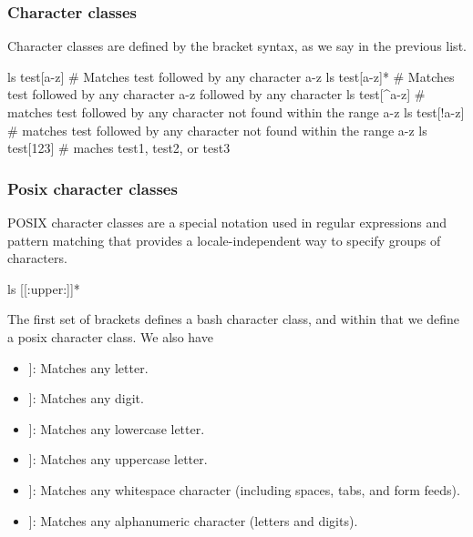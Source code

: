 \documentclass{report}
\begin{document}
    \subsubsection{Character classes}
    \bigbreak \noindent 
    Character classes are defined by the bracket syntax, as we say in the previous list.
    \bigbreak \noindent 
    \begin{bashcode}
        ls test[a-z] # Matches test followed by any character a-z
        ls test[a-z]* # Matches test followed by any character a-z followed by any character
        ls test[^a-z] # matches test followed by any character not found within the range a-z
        ls test[!a-z] # matches test followed by any character not found within the range a-z
        ls test[123] # maches test1, test2, or test3
    \end{bashcode}
    \bigbreak \noindent 
    \subsubsection{Posix character classes}
    \bigbreak \noindent 
    POSIX character classes are a special notation used in regular expressions and pattern matching that provides a locale-independent way to specify groups of characters. 
    \bigbreak \noindent 
    \begin{bashcode}
        ls [[:upper:]]* 
    \end{bashcode}
    \bigbreak \noindent 
    The first set of brackets defines a bash character class, and within that we define a posix character class. We also have
    \begin{itemize}
        \item \relax[[:alpha:]]: Matches any letter.
        \item \relax[[:digit:]]: Matches any digit.
        \item \relax[[:lower:]]: Matches any lowercase letter.
        \item \relax[[:upper:]]: Matches any uppercase letter.
        \item \relax[[:space:]]: Matches any whitespace character (including spaces, tabs, and form feeds).
        \item \relax[[:alnum:]]: Matches any alphanumeric character (letters and digits).
    \end{itemize}

    \pagebreak 
    \bigbreak \noindent 
\end{document}
